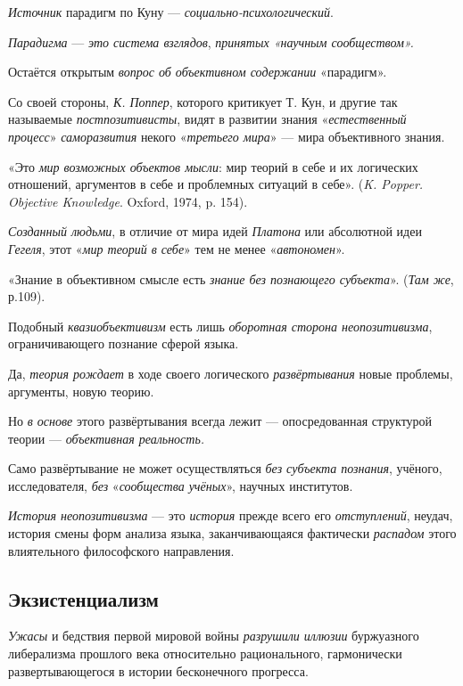 \documentclass[a4paper,14pt,russian]{extreport}
\begin{document}
\emph{Источник} парадигм по Куну --- \emph{социально-психологический}.

\emph{Парадигма} --- \emph{это система взглядов}, \emph{принятых «научным сообществом».}

Остаётся открытым \emph{вопрос об объективном содержании} «парадигм».

Со своей стороны, \emph{К. Поппер}, которого критикует Т. Кун, и другие так называемые \emph{постпозитивисты}, видят в развитии знания «\emph{естественный процесс}» \emph{саморазвития} некого «\emph{третьего мира}» --- мира объективного знания.

«Это \emph{мир возможных объектов мысли}: мир теорий в себе и их логических отношений, аргументов в себе и проблемных ситуаций в себе». (\emph{K. Popper. Objective Knowledge}. Oxford, 1974, p. 154).

\emph{Созданный людьми}, в отличие от мира идей \emph{Платона} или абсолютной идеи \emph{Гегеля}, этот «\emph{мир теорий в себе}» тем не менее «\emph{автономен}».

«Знание в объективном смысле есть \emph{знание без познающего субъекта}». (\emph{Там же}, р.109).

Подобный \emph{квазиобъективизм} есть лишь \emph{оборотная сторона неопозитивизма}, ограничивающего познание сферой языка.

Да, \emph{теория рождает} в ходе своего логического \emph{развёртывания} новые проблемы, аргументы, новую теорию.

Но \emph{в основе} этого развёртывания всегда лежит --- опосредованная структурой теории --- \emph{объективная реальность.}

Само развёртывание не может осуществляться \emph{без субъекта познания}, учёного, исследователя, \emph{без} «\emph{сообщества учёных}», научных институтов.

\emph{История неопозитивизма} --- это \emph{история} прежде всего его \emph{отступлений}, неудач, история смены форм анализа языка, заканчивающаяся фактически \emph{распадом} этого влиятельного философского направления.

\subsection{Экзистенциализм}

\emph{Ужасы} и бедствия первой мировой войны \emph{разрушили иллюзии} буржуазного либерализма прошлого века относительно рационального, гармонически развертывающегося в истории бесконечного прогресса.
\end{document}
